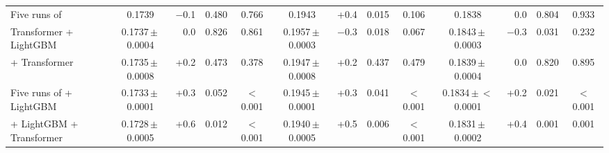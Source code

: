 \begin{tabular}{@{}lcrcccrcccrcc@{}}
Five runs of \HQ{} & 0.1739 & $-$0.1 & 0.480 & 0.766 & 0.1943 & +0.4 & 0.015 & 0.106 & 0.1838 & 0.0 & 0.804 & 0.933 \\
Transformer + LightGBM & 0.1737\,$\pm$\,0.0004 & 0.0 & 0.826 & 0.861 & 0.1957\,$\pm$\,0.0003 & $-$0.3 & 0.018 & 0.067 & 0.1843\,$\pm$\,0.0003 & $-$0.3 & 0.031 & 0.232 \\
\HQ{} + Transformer & 0.1735\,$\pm$\,0.0008 & +0.2 & 0.473 & 0.378 & 0.1947\,$\pm$\,0.0008 & +0.2 & 0.437 & 0.479 & 0.1839\,$\pm$\,0.0004 & 0.0 & 0.820 & 0.895 \\
Five runs of \HQ{} + LightGBM & 0.1733\,$\pm$\,0.0001 & +0.3 & 0.052 & $<$0.001 & 0.1945\,$\pm$\,0.0001 & +0.3 & 0.041 & $<$0.001 & 0.1834\,$\pm$\,$<$0.0001 & +0.2 & 0.021 & $<$0.001 \\
\HQ{} + LightGBM + Transformer & 0.1728\,$\pm$\,0.0005 & +0.6 & 0.012 & $<$0.001 & 0.1940\,$\pm$\,0.0005 & +0.5 & 0.006 & $<$0.001 & 0.1831\,$\pm$\,0.0002 & +0.4 & 0.001 & 0.001 \\
\bottomrule
\end{tabular}
